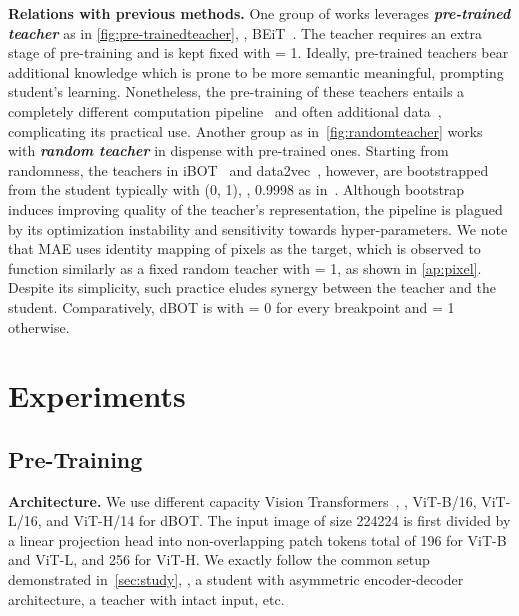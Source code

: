 \documentclass[10pt,twocolumn,letterpaper]{article}
\renewcommand{\paragraph}[1]{\vspace{1.25mm}\noindent\textbf{#1}}
\def\ourmethod{{dBOT}\xspace}
\def\ourmethodn{{dBOT}}
\begin{document}
\paragraph{Relations with previous methods.} 
One group of works leverages \textbf{\textit{pre-trained teacher}} as in \cref{fig:pre-trainedteacher}, \ie, BEiT~\cite{beit}.
The teacher requires an extra stage of pre-training and is kept fixed with  = 1. Ideally, pre-trained teachers bear additional knowledge which is prone to be more semantic meaningful, prompting student's learning. Nonetheless, the pre-training of these teachers entails a completely different computation pipeline~\cite{maskfeat} and often additional data~\cite{wei2022mvp}, complicating its practical use.
Another group as in~\cref{fig:randomteacher} works with \textbf{\textit{random teacher}} in dispense with pre-trained ones. Starting from randomness, the teachers in iBOT~\cite{zhou2021ibot} and data2vec~\cite{baevski2022data2vec}, however, are bootstrapped from the student typically with  (0, 1), \eg, 0.9998 as in~\cite{baevski2022data2vec}. Although bootstrap induces improving quality of the teacher's representation, the pipeline is plagued by its optimization instability and sensitivity towards hyper-parameters. We note that MAE uses identity mapping of pixels as the target, which is observed to function similarly as a fixed random teacher with  = 1, as shown in \cref{ap:pixel}. Despite its simplicity, such practice eludes synergy between the teacher and the student. 
 Comparatively, \ourmethod is with  = 0 for every breakpoint and  = 1 otherwise.



\section{Experiments}
\label{sec:exp}

\subsection{Pre-Training}

\paragraph{Architecture.}
We use different capacity Vision Transformers~\cite{vit}, \ie, ViT-B/16, ViT-L/16, and ViT-H/14 for \ourmethodn. 
The input image of size 224224 is first divided by a linear projection head into non-overlapping patch tokens total of 196 for ViT-B and ViT-L, and 256 for ViT-H. 
We exactly follow the common setup demonstrated in~\cref{sec:study}, \eg, a student with asymmetric encoder-decoder architecture, a teacher with intact input, etc.
\end{document}

